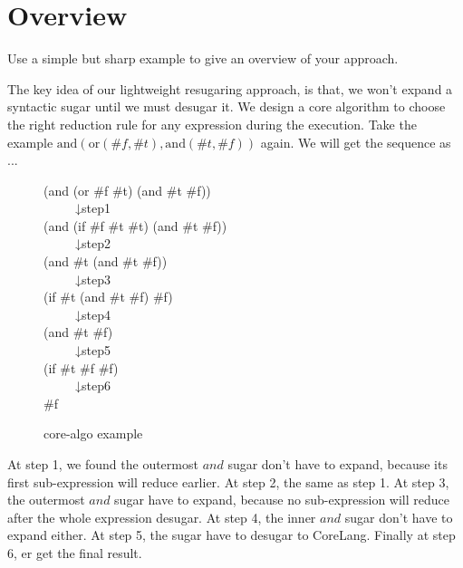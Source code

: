 \section{Overview}
\label{sec2}

Use a simple but sharp example to give an overview of your approach.

The key idea of our lightweight resugaring approach, is that, we won't expand a syntactic sugar until we must desugar it. We design a core algorithm to choose the right reduction rule for any expression during the execution. Take the example $\mbox{and}(\mbox{or}(\#f, \#t), \mbox{and}(\#t, \#f))$ again. We will get the sequence as ...

\begin{figure}[ht]
\parbox[t]{\textwidth}{
			\begin{center}  
				(and (or \#f \#t) (and \#t \#f))\\
				~~~~~↓step1\\
				(and (if \#f \#t \#t) (and \#t \#f))\\
				~~~~~↓step2\\
				(and \#t (and \#t \#f))\\
				~~~~~↓step3\\
				(if \#t (and \#t \#f) \#f)\\
				~~~~~↓step4\\
				(and \#t \#f)\\
				~~~~~↓step5\\
				(if \#t \#f \#f)\\
				~~~~~↓step6\\
				\#f
			\end{center}  
		}
\caption{core-algo example}
\label{fig:core-algo}
\end{figure}

At step 1, we found the outermost $and$ sugar don't have to expand, because its first sub-expression will reduce earlier. At step 2, the same as step 1. At step 3, the outermost $and$ sugar have to expand, because no sub-expression will reduce after the whole expression desugar. At step 4, the inner $and$ sugar don't have to expand either. At step 5, the sugar have to desugar to CoreLang. Finally at step 6, er get the final result.